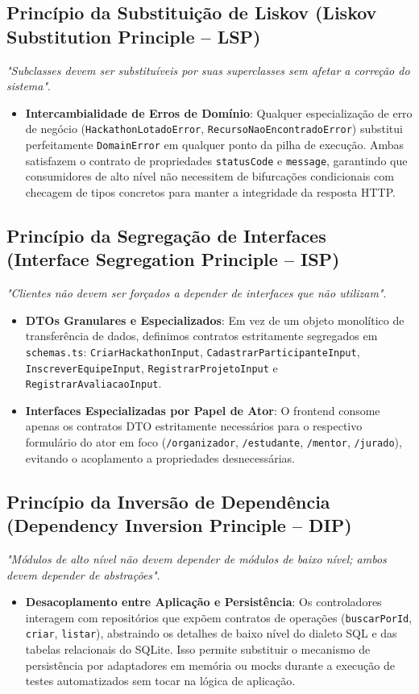 \documentclass[12pt]{article}
\begin{document}
\subsection{Princípio da Substituição de Liskov (Liskov Substitution Principle -- LSP)}
\textit{"Subclasses devem ser substituíveis por suas superclasses sem afetar a correção do sistema"}.
\begin{itemize}
    \item \textbf{Intercambialidade de Erros de Domínio}: Qualquer especialização de erro de negócio (\texttt{HackathonLotadoError}, \texttt{RecursoNaoEncontradoError}) substitui perfeitamente \texttt{DomainError} em qualquer ponto da pilha de execução. Ambas satisfazem o contrato de propriedades \texttt{statusCode} e \texttt{message}, garantindo que consumidores de alto nível não necessitem de bifurcações condicionais com checagem de tipos concretos para manter a integridade da resposta HTTP.
\end{itemize}

\subsection{Princípio da Segregação de Interfaces (Interface Segregation Principle -- ISP)}
\textit{"Clientes não devem ser forçados a depender de interfaces que não utilizam"}.
\begin{itemize}
    \item \textbf{DTOs Granulares e Especializados}: Em vez de um objeto monolítico de transferência de dados, definimos contratos estritamente segregados em \texttt{schemas.ts}: \texttt{CriarHackathonInput}, \texttt{CadastrarParticipanteInput}, \texttt{InscreverEquipeInput}, \texttt{RegistrarProjetoInput} e \texttt{RegistrarAvaliacaoInput}.
    \item \textbf{Interfaces Especializadas por Papel de Ator}: O frontend consome apenas os contratos DTO estritamente necessários para o respectivo formulário do ator em foco (\texttt{/organizador}, \texttt{/estudante}, \texttt{/mentor}, \texttt{/jurado}), evitando o acoplamento a propriedades desnecessárias.
\end{itemize}

\subsection{Princípio da Inversão de Dependência (Dependency Inversion Principle -- DIP)}
\textit{"Módulos de alto nível não devem depender de módulos de baixo nível; ambos devem depender de abstrações"}.
\begin{itemize}
    \item \textbf{Desacoplamento entre Aplicação e Persistência}: Os controladores interagem com repositórios que expõem contratos de operações (\texttt{buscarPorId}, \texttt{criar}, \texttt{listar}), abstraindo os detalhes de baixo nível do dialeto SQL e das tabelas relacionais do SQLite. Isso permite substituir o mecanismo de persistência por adaptadores em memória ou mocks durante a execução de testes automatizados sem tocar na lógica de aplicação.
\end{itemize}
\end{document}
